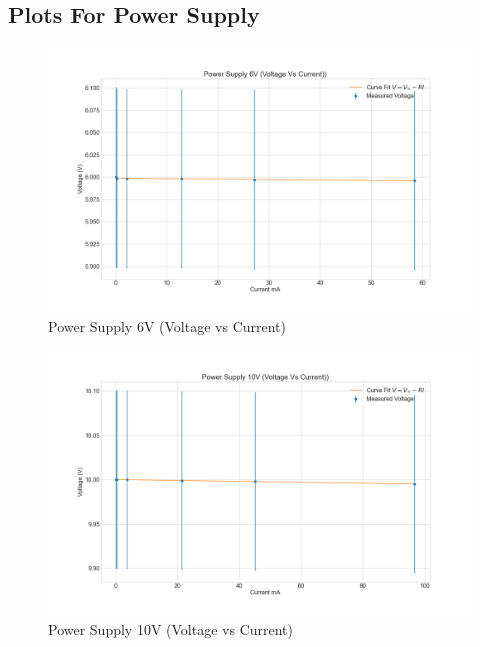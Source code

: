 \documentclass[letterpaper,12pt]{article}
\begin{document}
\subsection{Plots For Power Supply}

\begin{figure}[H]
  \centering
  \includegraphics[width=0.95\linewidth]{../code/Fredrik/Power supply 6V lab5_voltage_vs_current.png}    
  \caption{Power Supply 6V (Voltage vs Current)}
  \label{ps-6}
\end{figure}

\begin{figure}[H]
  \centering
  \includegraphics[width=0.95\linewidth]{../code/Fredrik/Power supply 10V lab5_voltage_vs_current.png}    
  \caption{Power Supply 10V (Voltage vs Current)}
  \label{ps-10}
\end{figure}
\end{document}
